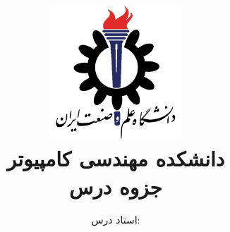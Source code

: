 \title{
    \center
    \includegraphics[width=5cm, height=5cm]{images/IUST_logo_color.png} \\
    دانشکده مهندسی کامپیوتر \\[25pt]     
جزوه درس \\
\CourseName
}

\author{
    استاد درس:
    \Instructor \\[25pt]
}
\date{\Semester}
